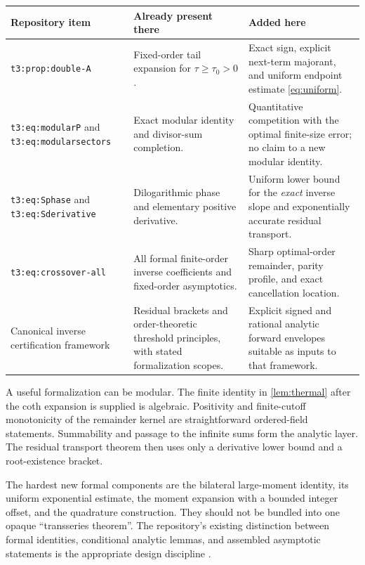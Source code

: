 \documentclass[11pt,a4paper]{article}
\numberwithin{equation}{section}
\theoremstyle{plain}
\theoremstyle{definition}
\theoremstyle{remark}
\begin{document}
\begingroup\small
\begin{longtable}{@{}>{\raggedright\arraybackslash}p{}>{\raggedright\arraybackslash}p{}>{\raggedright\arraybackslash}p{}@{}}
\toprule
Repository item & Already present there & Added here\\
\midrule
\endhead
\texttt{t3:prop:double-A}
& Fixed-order tail expansion for $\tau\ge\tau_0>0$.
& Exact sign, explicit next-term majorant, and uniform endpoint estimate
\eqref{eq:uniform}.\\[4pt]
\texttt{t3:eq:modularP} and \texttt{t3:eq:modularsectors}
& Exact modular identity and divisor-sum completion.
& Quantitative competition with the optimal finite-size error; no claim to a
new modular identity.\\[4pt]
\texttt{t3:eq:Sphase} and \texttt{t3:eq:Sderivative}
& Dilogarithmic phase and elementary positive derivative.
& Uniform lower bound for the \emph{exact} inverse slope and exponentially
accurate residual transport.\\[4pt]
\texttt{t3:eq:crossover-all}
& All formal finite-order inverse coefficients and fixed-order asymptotics.
& Sharp optimal-order remainder, parity profile, and exact cancellation
location.\\[4pt]
Canonical inverse certification framework
& Residual brackets and order-theoretic threshold principles, with stated
formalization scopes.
& Explicit signed and rational analytic forward envelopes suitable as inputs
to that framework.\\
\bottomrule
\end{longtable}
\endgroup

A useful formalization can be modular. The finite identity in
\cref{lem:thermal} after the coth expansion is supplied is algebraic.
Positivity and finite-cutoff monotonicity of the remainder kernel are
straightforward ordered-field statements. Summability and passage to the
infinite sums form the analytic layer. The residual transport theorem then
uses only a derivative lower bound and a root-existence bracket.

The hardest new formal components are the bilateral large-moment identity,
its uniform exponential estimate, the moment expansion with a bounded integer
offset, and the quadrature construction. They should not be bundled into one
opaque ``transseries theorem''. The repository's existing distinction between
formal identities, conditional analytic lemmas, and assembled asymptotic
statements is the appropriate design discipline \cite{repo-readme}.
\end{document}
